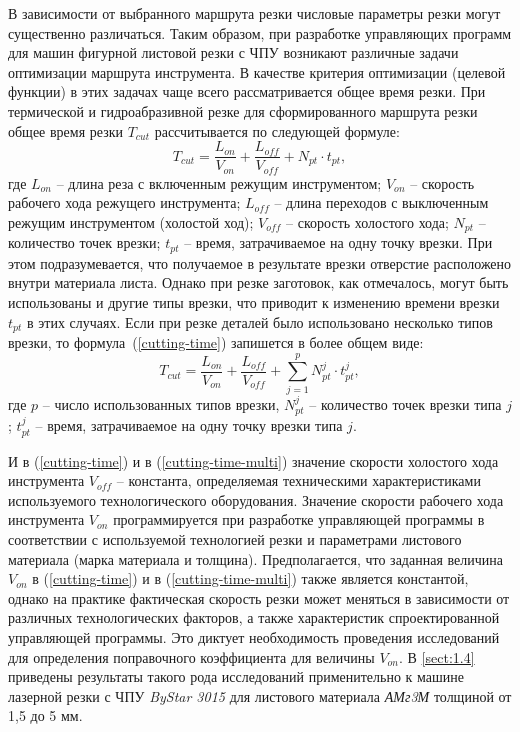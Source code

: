 \documentclass[11pt,twoside,openany]{report}
\begin{document}
В зависимости от выбранного маршрута резки
числовые параметры резки могут существенно различаться.
Таким образом, при разработке управляющих программ
для машин фигурной листовой резки с ЧПУ возникают
различные задачи оптимизации маршрута инструмента.
В качестве критерия оптимизации (целевой функции)
в этих задачах чаще всего рассматривается общее время резки.
При термической и гидроабразивной резке для сформированного
маршрута резки общее время резки
$T_{cut}$
рассчитывается по следующей формуле:
\begin{equation}
  T_{cut} = \frac{L_{on}}{V_{on}} + \frac{L_{off}}{V_{off}} +N_{pt} \cdot t_{pt}
  ,
  \label{cutting-time}
\end{equation}
где
$L_{on}$ -- длина реза с включенным режущим инструментом;
$V_{on}$ -- скорость рабочего хода режущего инструмента;
$L_{off}$ -- длина переходов с выключенным режущим инструментом (холостой ход);
$V_{off}$ -- скорость холостого хода;
$N_{pt}$ -- количество точек врезки;
$t_{pt}$ -- время, затрачиваемое на одну точку врезки.
При этом подразумевается,
что получаемое в результате врезки отверстие
расположено внутри материала листа.
Однако при резке заготовок, как отмечалось,
могут быть использованы и другие типы врезки,
что приводит к изменению времени врезки
$t_{pt}$
в этих случаях.
Если при резке деталей было использовано несколько типов врезки,
то формула~(\ref{cutting-time}) запишется в более общем виде:
\begin{equation}
  T_{cut} = \frac{L_{on}}{V_{on}} + \frac{L_{off}}{V_{off}} +
  \sum_{j=1}^p N_{pt}^j \cdot t_{pt}^j
  ,
  \label{cutting-time-multi}
\end{equation}
где
$p$ -- число использованных типов врезки,
$N_{pt}^j$ -- количество точек врезки типа $j$;
$t_{pt}^j$ -- время, затрачиваемое на одну точку врезки типа $j$.

И в (\ref{cutting-time})
и в (\ref{cutting-time-multi})
значение скорости холостого хода инструмента
$V_{off}$ -- константа,
определяемая техническими характеристиками
используемого технологического оборудования.
Значение скорости рабочего хода инструмента
$V_{on}$
программируется при разработке управляющей программы
в соответствии с используемой технологией резки
и параметрами листового материала
(марка материала и толщина).
Предполагается, что заданная величина
$V_{on}$  в (\ref{cutting-time}) и в (\ref{cutting-time-multi})
также является константой,
однако на практике фактическая скорость резки
может меняться в зависимости от различных технологических факторов,
а также характеристик спроектированной управляющей программы.
Это диктует необходимость проведения исследований для
определения поправочного коэффициента для величины
$V_{on}$.
В \ref{sect:1.4}
приведены результаты такого рода исследований
применительно к машине лазерной резки с ЧПУ
\textit{ByStar 3015}
для листового материала
\textit{АМг3М} толщиной от 1,5 до 5 мм.
\end{document}
